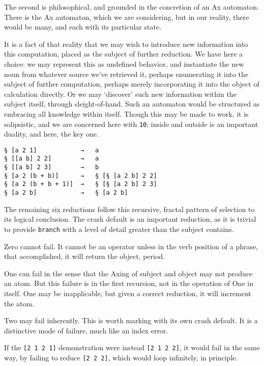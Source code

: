 \documentclass[twoside]{article}
\begin{document}
The second is philosophical, and grounded in the concretion of an Ax automaton. There is the Ax automaton, which we are considering, but in our reality, there would be many, and each with its particular state.

It is a fact of that reality that we may wish to introduce new information into this computation, placed as the subject of further reduction. We have here a choice: we may represent this as undefined behavior, and instantiate the new noun from whatever source we've retrieved it, perhaps enumerating it into the subject of further computation, perhaps merely incorporating it into the object of calculation directly.
Or we may `discover' such new information within the subject itself, through sleight-of-hand. Such an automaton would be structured as embracing all knowledge within itself. Though this may be made to work, it is solipsistic, and we are concerned here with \texttt{10}; inside and outside is an important duality, and here, the key one.

\begin{lstlisting}[style=listingcode]
§ [a 2 1]            →   a
§ [[a b] 2 2]        →   a
§ [[a b] 2 3]        →   b
§ [a 2 (b + b)]      →   § [§ [a 2 b] 2 2]
§ [a 2 (b + b + 1)]  →   § [§ [a 2 b] 2 3]
§ [a 2 b]            →   § [a 2 b]
\end{lstlisting}

The remaining six reductions follow this recursive, fractal pattern of selection to its logical conclusion. The crash default is an important reduction, as it is trivial to provide \texttt{branch} with a level of detail greater than the subject contains.

Zero cannot fail. It cannot be an operator unless in the verb position of a phrase, that accomplished, it will return the object, period.

One can fail in the sense that the Axing of subject and object may not produce an atom. But this failure is in the first recursion, not in the operation of One in itself. One may be inapplicable, but given a correct reduction, it will increment the atom.

Two may fail inherently. This is worth marking with its own crash default. It is a distinctive mode of failure, much like an index error.

If the \lstinline[style=inlinecode]{[2 1 2 1]} demonstration were instead \lstinline[style=inlinecode]{[2 1 2 2]}, it would fail in the same way, by failing to reduce \lstinline[style=inlinecode]{[2 2 2]}, which would loop infinitely, in principle.
\end{document}
